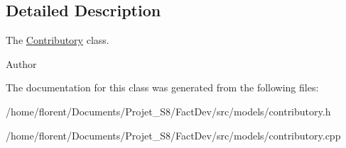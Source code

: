 \subsection{Detailed Description}
The \hyperlink{classContributory}{Contributory} class. 

\begin{DoxyAuthor}{Author}

\end{DoxyAuthor}


The documentation for this class was generated from the following files\-:\begin{DoxyCompactItemize}
\item 
/home/florent/\-Documents/\-Projet\-\_\-\-S8/\-Fact\-Dev/src/models/contributory.\-h\item 
/home/florent/\-Documents/\-Projet\-\_\-\-S8/\-Fact\-Dev/src/models/contributory.\-cpp\end{DoxyCompactItemize}
